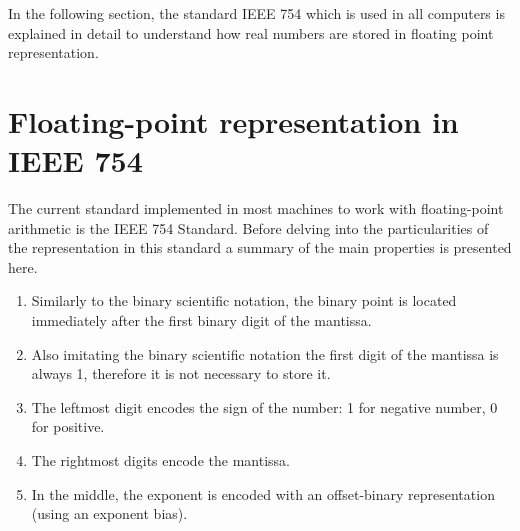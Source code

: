 In the following section, 
the standard IEEE 754 which is used in all computers is 
explained in detail to understand how real numbers are stored in 
floating point representation.












    \section{Floating-point representation in IEEE 754}


The current standard implemented in most machines to work with floating-point arithmetic is the IEEE 754 Standard. Before delving into the particularities of the representation in this standard a summary of the main properties is presented here. 

\begin{enumerate}
    \item Similarly to the binary scientific notation, the binary point is located immediately after the first binary digit of the mantissa. 
    \item Also imitating the binary scientific notation the first digit of the mantissa is always 1, therefore it is not necessary to store it.
    \item The leftmost digit encodes the sign of the number: 1 for negative number, 0 for positive.
    \item The rightmost digits encode the mantissa. 
    \item In the middle, the exponent is encoded with an offset-binary representation (using an exponent bias).
\end{enumerate} 

